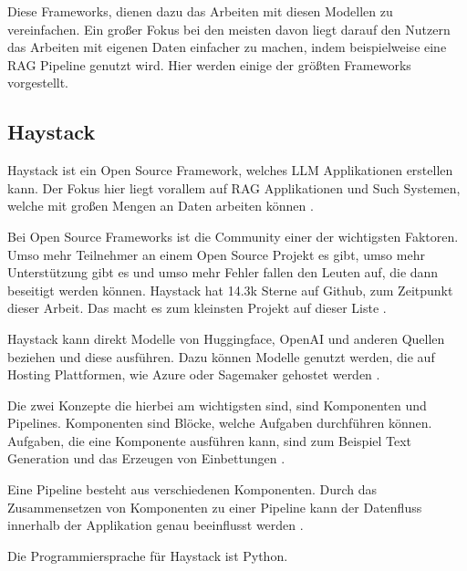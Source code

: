 Diese Frameworks, dienen dazu
das Arbeiten mit diesen Modellen zu vereinfachen. Ein großer Fokus bei den meisten 
davon liegt darauf den Nutzern das Arbeiten mit eigenen Daten einfacher zu 
machen, indem beispielweise eine RAG Pipeline genutzt wird. 
Hier werden einige der größten 
Frameworks vorgestellt.

\subsection{Haystack}
Haystack ist ein Open Source Framework, welches LLM Applikationen erstellen
kann. Der Fokus hier liegt vorallem auf RAG Applikationen und Such Systemen,
welche mit großen Mengen an Daten arbeiten können \cite{WhatHaystack}.\par
Bei Open Source Frameworks ist die Community einer der wichtigsten Faktoren. 
Umso mehr Teilnehmer an einem Open Source Projekt es gibt, umso mehr
Unterstützung gibt es und umso mehr Fehler fallen den Leuten auf, die 
dann beseitigt werden können. Haystack hat 14.3k Sterne auf Github, zum 
Zeitpunkt dieser Arbeit. Das macht es zum kleinsten Projekt auf dieser
Liste \cite{DeepsetaiHaystackMag}. \par
Haystack kann direkt Modelle von Huggingface, OpenAI und anderen Quellen beziehen 
und diese ausführen. Dazu können Modelle genutzt werden, die auf Hosting Plattformen, 
wie Azure oder Sagemaker gehostet werden \cite{WhatHaystack}.\par
Die zwei Konzepte die hierbei am wichtigsten sind, sind Komponenten und Pipelines. 
Komponenten sind Blöcke, welche Aufgaben durchführen können. Aufgaben, die eine 
Komponente ausführen kann, sind zum Beispiel Text Generation und das Erzeugen von
Einbettungen \cite{WhatHaystack}.\par
Eine Pipeline besteht aus verschiedenen Komponenten. Durch das Zusammensetzen 
von Komponenten zu einer Pipeline kann der Datenfluss innerhalb
der Applikation genau beeinflusst werden \cite{WhatHaystack}.\par
Die Programmiersprache für Haystack ist Python\cite{WhatHaystack, DeepsetaiHaystackMag}. 

